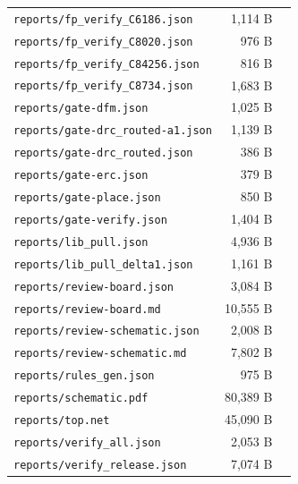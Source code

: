 \documentclass[11pt,a4paper]{article}
\begin{document}
{\begin{longtable}{p{9cm}rp{4cm}}
\texttt{reports/fp\_verify\_C6186.json} & 1,114 B &  \\
\texttt{reports/fp\_verify\_C8020.json} & 976 B &  \\
\texttt{reports/fp\_verify\_C84256.json} & 816 B &  \\
\texttt{reports/fp\_verify\_C8734.json} & 1,683 B &  \\
\texttt{reports/gate-dfm.json} & 1,025 B &  \\
\texttt{reports/gate-drc\_routed-a1.json} & 1,139 B &  \\
\texttt{reports/gate-drc\_routed.json} & 386 B &  \\
\texttt{reports/gate-erc.json} & 379 B &  \\
\texttt{reports/gate-place.json} & 850 B &  \\
\texttt{reports/gate-verify.json} & 1,404 B &  \\
\texttt{reports/lib\_pull.json} & 4,936 B &  \\
\texttt{reports/lib\_pull\_delta1.json} & 1,161 B &  \\
\texttt{reports/review-board.json} & 3,084 B &  \\
\texttt{reports/review-board.md} & 10,555 B &  \\
\texttt{reports/review-schematic.json} & 2,008 B &  \\
\texttt{reports/review-schematic.md} & 7,802 B &  \\
\texttt{reports/rules\_gen.json} & 975 B &  \\
\texttt{reports/schematic.pdf} & 80,389 B &  \\
\texttt{reports/top.net} & 45,090 B &  \\
\texttt{reports/verify\_all.json} & 2,053 B &  \\
\texttt{reports/verify\_release.json} & 7,074 B &  \\
\bottomrule
\end{longtable}
}
\end{document}
